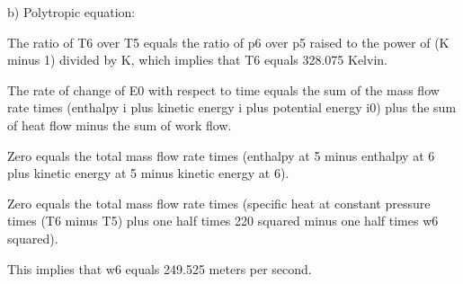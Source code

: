 b) Polytropic equation:

The ratio of T6 over T5 equals the ratio of p6 over p5 raised to the power of (K minus 1) divided by K, which implies that T6 equals 328.075 Kelvin.

The rate of change of E0 with respect to time equals the sum of the mass flow rate times (enthalpy i plus kinetic energy i plus potential energy i0) plus the sum of heat flow minus the sum of work flow.

Zero equals the total mass flow rate times (enthalpy at 5 minus enthalpy at 6 plus kinetic energy at 5 minus kinetic energy at 6).

Zero equals the total mass flow rate times (specific heat at constant pressure times (T6 minus T5) plus one half times 220 squared minus one half times w6 squared).

This implies that w6 equals 249.525 meters per second.